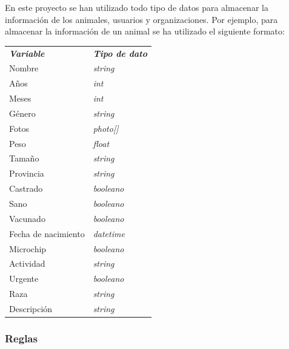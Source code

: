 En este proyecto se han utilizado todo tipo de datos para almacenar la información de los animales, usuarios y organizaciones.
Por ejemplo, para almacenar la información de un animal se ha utilizado el siguiente formato:

\begin{table}[H]
\begin{tabular}{ll}
\textit{\textbf{Variable}} & \textit{\textbf{Tipo de dato}} \\
Nombre                     & \textit{string}                \\
Años                       & \textit{int}                   \\
Meses                      & \textit{int}                   \\
Género                     & \textit{string}                \\
Fotos                      & \textit{photo{[}{]}}             \\
Peso                       & \textit{float}                 \\
Tamaño                     & \textit{string}                \\
Provincia                  & \textit{string}                \\
Castrado                   & \textit{booleano}              \\
Sano                       & \textit{booleano}              \\
Vacunado                   & \textit{booleano}              \\
Fecha de nacimiento        & \textit{datetime}              \\
Microchip                  & \textit{booleano}              \\
Actividad                  & \textit{string}                \\
Urgente                    & \textit{booleano}              \\
Raza                       & \textit{string}                \\
Descripción                & \textit{string}
\end{tabular}
\end{table}

\newpage

\subsubsection{Reglas}\label{subsubsec:reglas}


